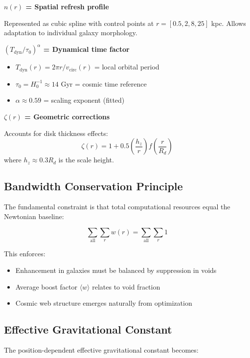 \documentclass[12pt,letterpaper]{article}
\newcommand{\tdyn}{T_{\text{dyn}}}
\begin{document}
\textbf{$n(r)$ = Spatial refresh profile}

Represented as cubic spline with control points at $r = [0.5, 2, 8, 25]$ kpc. Allows adaptation to individual galaxy morphology.

\textbf{$(\tdyn/\tau_0)^\alpha$ = Dynamical time factor}
\begin{itemize}
\item $\tdyn(r) = 2\pi r/v_{\text{circ}}(r)$ = local orbital period
\item $\tau_0 = H_0^{-1} \approx 14$ Gyr = cosmic time reference
\item $\alpha \approx 0.59$ = scaling exponent (fitted)
\end{itemize}

\textbf{$\zeta(r)$ = Geometric corrections}

Accounts for disk thickness effects:
\begin{equation}
\zeta(r) = 1 + 0.5\left(\frac{h_z}{r}\right)f\left(\frac{r}{R_d}\right)
\label{eq:zeta}
\end{equation}
where $h_z \approx 0.3R_d$ is the scale height.

\subsection{Bandwidth Conservation Principle}

The fundamental constraint is that total computational resources equal the Newtonian baseline:

\begin{equation}
\sum_{\text{all}} \sum_r w(r) = \sum_{\text{all}} \sum_r 1
\label{eq:conservation}
\end{equation}

This enforces:
\begin{itemize}
\item Enhancement in galaxies must be balanced by suppression in voids
\item Average boost factor $\langle w \rangle$ relates to void fraction
\item Cosmic web structure emerges naturally from optimization
\end{itemize}

\subsection{Effective Gravitational Constant}

The position-dependent effective gravitational constant becomes:
\end{document}
